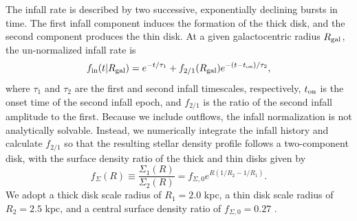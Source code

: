 \documentclass[twocolumn,twocolappendix,linenumbers]{aastex631}
\begin{document}
The infall rate is described by two successive, exponentially declining bursts in time. The first infall component induces the formation of the thick disk, and the second component produces the thin disk. At a given galactocentric radius $R_{\rm gal}$, the un-normalized infall rate is
\begin{equation}
    \label{eq:twoinfall-ifr}
    f_{\rm in}(t|R_{\rm gal}) = e^{-t/\tau_1} + f_{2/1}(R_{\rm gal}) e^{-(t-t_{\rm on})/\tau_2},
\end{equation}
where $\tau_1$ and $\tau_2$ are the first and second infall timescales, respectively, $t_{\rm on}$ is the onset time of the second infall epoch, and $f_{2/1}$ is the ratio of the second infall amplitude to the first. Because we include outflows, the infall normalization is not analytically solvable. Instead, we numerically integrate the infall history and calculate $f_{2/1}$ so that the resulting stellar density profile follows a two-component disk, with the surface density ratio of the thick and thin disks given by
\begin{equation}
    f_\Sigma(R) \equiv \frac{\Sigma_1(R)}{\Sigma_2(R)} = f_{\Sigma,0} e^{R(1/R_2 - 1/R_1)}.
\end{equation}
We adopt a thick disk scale radius of $R_1=2.0$ kpc, a thin disk scale radius of $R_2=2.5$ kpc, and a central surface density ratio of $f_{\Sigma,0}=0.27$ \citet{bland-hawthorn_galaxy_2016}.
\end{document}

